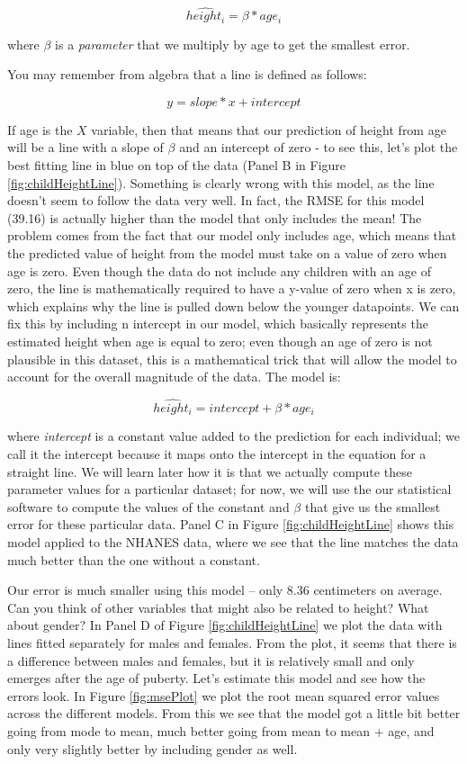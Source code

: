 \documentclass[12pt,]{book}
\theoremstyle{definition}
\theoremstyle{definition}
\theoremstyle{definition}
\theoremstyle{remark}
\begin{document}
\[
\hat{height_i} =  \beta * age_i
\]

where \(\beta\) is a \emph{parameter} that we multiply by age to get the smallest error.

You may remember from algebra that a line is defined as follows:

\[
y = slope*x + intercept
\]

If age is the \(X\) variable, then that means that our prediction of height from age will be a line with a slope of \(\beta\) and an intercept of zero - to see this, let's plot the best fitting line in blue on top of the data (Panel B in Figure \ref{fig:childHeightLine}). Something is clearly wrong with this model, as the line doesn't seem to follow the data very well. In fact, the RMSE for this model (39.16) is actually higher than the model that only includes the mean! The problem comes from the fact that our model only includes age, which means that the predicted value of height from the model must take on a value of zero when age is zero. Even though the data do not include any children with an age of zero, the line is mathematically required to have a y-value of zero when x is zero, which explains why the line is pulled down below the younger datapoints. We can fix this by including n intercept in our model, which basically represents the estimated height when age is equal to zero; even though an age of zero is not plausible in this dataset, this is a mathematical trick that will allow the model to account for the overall magnitude of the data. The model is:

\[
\hat{height_i} = intercept + \beta * age_i
\]

where \emph{intercept} is a constant value added to the prediction for each individual; we call it the intercept because it maps onto the intercept in the equation for a straight line. We will learn later how it is that we actually compute these parameter values for a particular dataset; for now, we will use the our statistical software to compute the values of the constant and \(\beta\) that give us the smallest error for these particular data. Panel C in Figure \ref{fig:childHeightLine} shows this model applied to the NHANES data, where we see that the line matches the data much better than the one without a constant.

Our error is much smaller using this model -- only 8.36 centimeters on average. Can you think of other variables that might also be related to height? What about gender? In Panel D of Figure \ref{fig:childHeightLine} we plot the data with lines fitted separately for males and females. From the plot, it seems that there is a difference between males and females, but it is relatively small and only emerges after the age of puberty. Let's estimate this model and see how the errors look. In Figure \ref{fig:msePlot} we plot the root mean squared error values across the different models. From this we see that the model got a little bit better going from mode to mean, much better going from mean to mean + age, and only very slightly better by including gender as well.
\end{document}
